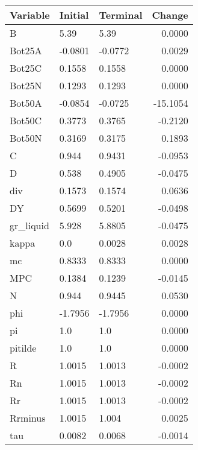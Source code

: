 \begin{table}
\centering
\label{tab:stst_comparison_end_L_wedge_permanent}
\begin{tabular}{lllr}
\toprule
                Variable & Initial & Terminal &   Change \\
\midrule
                       B &    5.39 &     5.39 &   0.0000 \\
                  Bot25A & -0.0801 &  -0.0772 &   0.0029 \\
                  Bot25C &  0.1558 &   0.1558 &   0.0000 \\
                  Bot25N &  0.1293 &   0.1293 &   0.0000 \\
                  Bot50A & -0.0854 &  -0.0725 & -15.1054 \\
                  Bot50C &  0.3773 &   0.3765 &  -0.2120 \\
                  Bot50N &  0.3169 &   0.3175 &   0.1893 \\
                       C &   0.944 &   0.9431 &  -0.0953 \\
                       D &   0.538 &   0.4905 &  -0.0475 \\
                     div &  0.1573 &   0.1574 &   0.0636 \\
                      DY &  0.5699 &   0.5201 &  -0.0498 \\
               gr\_liquid &   5.928 &   5.8805 &  -0.0475 \\
                   kappa &     0.0 &   0.0028 &   0.0028 \\
                      mc &  0.8333 &   0.8333 &   0.0000 \\
                     MPC &  0.1384 &   0.1239 &  -0.0145 \\
                       N &   0.944 &   0.9445 &   0.0530 \\
                     phi & -1.7956 &  -1.7956 &   0.0000 \\
                      pi &     1.0 &      1.0 &   0.0000 \\
                 pitilde &     1.0 &      1.0 &   0.0000 \\
                       R &  1.0015 &   1.0013 &  -0.0002 \\
                      Rn &  1.0015 &   1.0013 &  -0.0002 \\
                      Rr &  1.0015 &   1.0013 &  -0.0002 \\
                 Rrminus &  1.0015 &    1.004 &   0.0025 \\
                     tau &  0.0082 &   0.0068 &  -0.0014 \\

\end{tabular}
\end{table}
